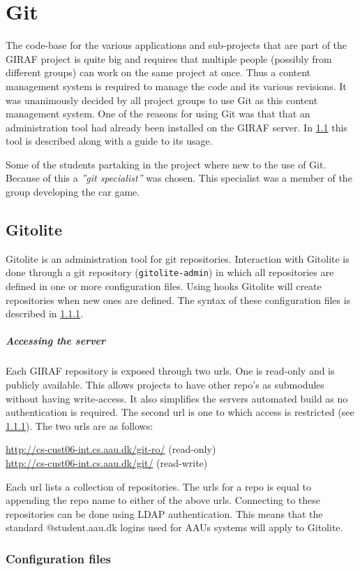 \chapter{Git}
The code-base for the various applications and sub-projects that are part of the GIRAF project is quite big and requires that multiple people (possibly from different groups) can work on the same project at once.
Thus a content management system is required to manage the code and its various revisions. 
It was unanimously decided by all project groups to use Git as this content management system.
One of the reasons for using Git was that that an administration tool had already been installed on the GIRAF server.
In \cref{git:gitolite} this tool is described along with a guide to its usage.

Some of the students partaking in the project where new to the use of Git.
Because of this a \textit{''git specialist''} was chosen.
This specialist was a member of the group developing the car game. 

\section{Gitolite}\label{git:gitolite}
Gitolite is an administration tool for git repositories.
Interaction with Gitolite is done through a git repository (\texttt{gitolite-admin}) in which all repositories are defined in one or more configuration files.
Using hooks Gitolite will create repositories when new ones are defined.
The syntax of these configuration files is described in \cref{git:gitolite:config}.

\paragraph{Accessing the server}
Each GIRAF repository is exposed through two urls.
One is read-only and is publicly available.
This allows projects to have other repo's as submodules without having write-access.
It also simplifies the servers automated build as no authentication is required.
The second url is one to which access is restricted (see \cref{git:gitolite:config}).
The two urls are as follows:
\begin{center}
\url{http://cs-cust06-int.cs.aau.dk/git-ro/} (read-only)\\
\url{http://cs-cust06-int.cs.aau.dk/git/} (read-write)
\end{center}
Each url lists a collection of repositories.
The urls for a repo is equal to appending the repo name to either of the above urls.
Connecting to these repositories can be done using LDAP authentication.
This means that the standard @student.aau.dk logins used for AAUs systems will apply to Gitolite.

\subsection{Configuration files}\label{git:gitolite:config}

